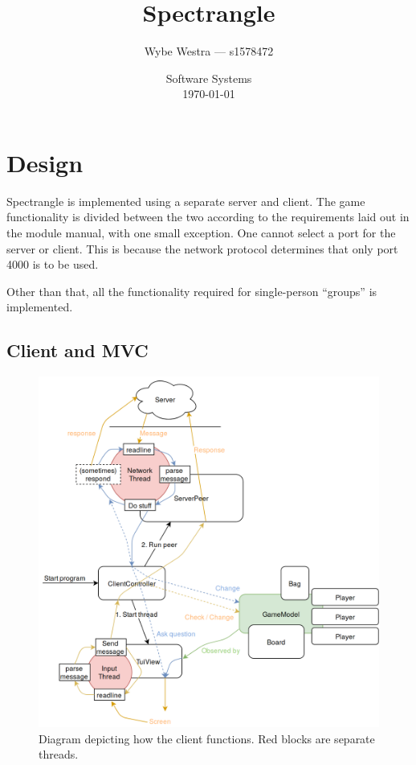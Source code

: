 \documentclass[12pt, letterpaper]{article}
\title{Spectrangle}
\author{Wybe Westra --- s1578472}
\date{Software Systems \\ \today}
\begin{document}
    \maketitle

    \newpage

    \tableofcontents

    \newpage


    \section{Design}

    Spectrangle is implemented using a separate server and client.
    The game functionality is divided between the two according to the requirements laid out in the module manual,
    with one small exception.
    One cannot select a port for the server or client.
    This is because the network protocol determines that only port 4000 is to be used.

    Other than that, all the functionality required for single-person ``groups'' is implemented.


    \subsection{Client and MVC}
    \label{subsec:clientAndMVC}

    \begin{figure}[ht]
        \begin{center}
            \includegraphics[width=\textwidth]{Client.png}
            \caption{Diagram depicting how the client functions.
            Red blocks are separate threads.}
            \label{fig:clientDiagram}
        \end{center}
    \end{figure}
\end{document}
